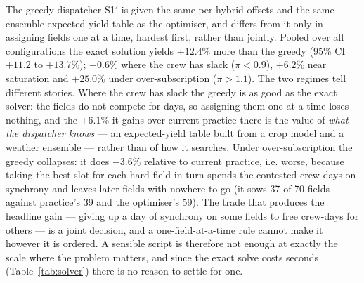 \documentclass[10pt,twocolumn]{article}
\begin{document}
The greedy dispatcher S1$'$ is given the same per-hybrid offsets and
the same ensemble expected-yield table as the optimiser, and differs
from it only in assigning fields one at a time, hardest first, rather
than jointly. Pooled over all configurations the exact solution
yields $+12.4$\% more than the greedy
(95\% CI $+11.2$ to $+13.7$\%);
$+0.6$\% where the crew has slack ($\pi < 0.9$),
$+6.2$\% near saturation and $+25.0$\% under
over-subscription ($\pi > 1.1$).
The two regimes tell different stories. Where the crew has slack
the greedy is as good as the exact solver: the fields do not compete
for days, so assigning them one at a time loses nothing, and the
$+6.1$\% it gains over current practice there is the
value of \emph{what the dispatcher knows} --- an expected-yield
table built from a crop model and a weather ensemble --- rather than
of how it searches. Under over-subscription the greedy collapses:
it does $-3.6$\% relative to current practice, i.e.
worse, because taking the best slot for each hard field in turn
spends the contested crew-days on synchrony and leaves later fields
with nowhere to go (it sows 37 of
70 fields against practice's 39
and the optimiser's 59). The
trade that produces the headline gain --- giving up a day of
synchrony on some fields to free crew-days for others --- is a
joint decision, and a one-field-at-a-time rule cannot make it
however it is ordered. A sensible script is therefore not enough
at exactly the scale where the problem matters, and since the exact
solve costs seconds (Table~\ref{tab:solver}) there is no reason to
settle for one.
\end{document}
